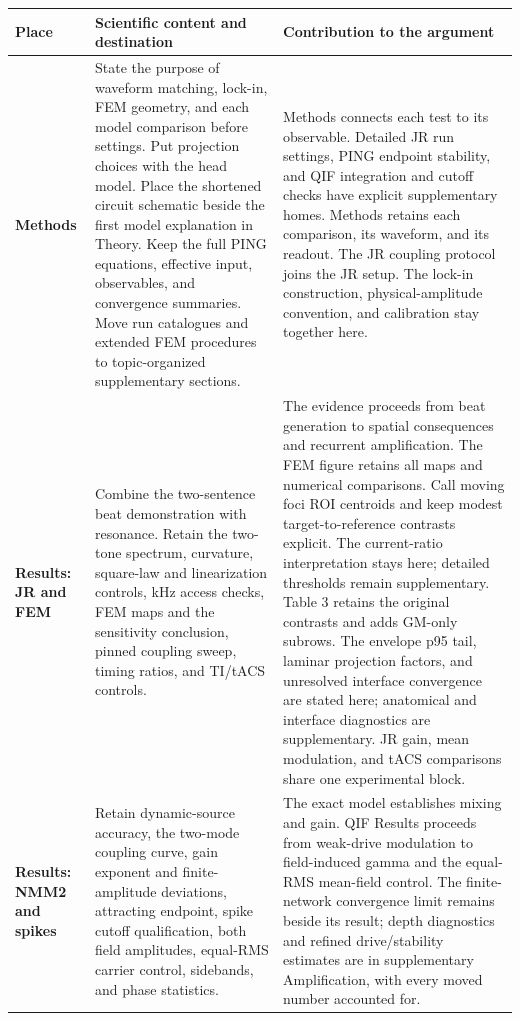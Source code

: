 \documentclass[11pt,a4paper,landscape]{article}
\begin{document}
\begin{tabularx}{\textwidth}{@{}L{43mm}YY@{}}
\toprule
\textbf{Place} & \textbf{Scientific content and destination} & \textbf{Contribution to the argument}\\
\midrule
\textbf{Methods} & State the purpose of waveform matching, lock-in, FEM geometry, and each model comparison before settings. Put projection choices with the head model. Place the shortened circuit schematic beside the first model explanation in Theory. Keep the full PING equations, effective input, observables, and convergence summaries. Move run catalogues and extended FEM procedures to topic-organized supplementary sections. & Methods connects each test to its observable. Detailed JR run settings, PING endpoint stability, and QIF integration and cutoff checks have explicit supplementary homes. Methods retains each comparison, its waveform, and its readout. The JR coupling protocol joins the JR setup. The lock-in construction, physical-amplitude convention, and calibration stay together here.\\[8pt]
\textbf{Results: JR and FEM} & Combine the two-sentence beat demonstration with resonance. Retain the two-tone spectrum, curvature, square-law and linearization controls, kHz access checks, FEM maps and the sensitivity conclusion, pinned coupling sweep, timing ratios, and TI/tACS controls. & The evidence proceeds from beat generation to spatial consequences and recurrent amplification. The FEM figure retains all maps and numerical comparisons. Call moving foci ROI centroids and keep modest target-to-reference contrasts explicit. The current-ratio interpretation stays here; detailed thresholds remain supplementary. Table 3 retains the original contrasts and adds GM-only subrows. The envelope p95 tail, laminar projection factors, and unresolved interface convergence are stated here; anatomical and interface diagnostics are supplementary. JR gain, mean modulation, and tACS comparisons share one experimental block.\\[8pt]
\textbf{Results: NMM2 and spikes} & Retain dynamic-source accuracy, the two-mode coupling curve, gain exponent and finite-amplitude deviations, attracting endpoint, spike cutoff qualification, both field amplitudes, equal-RMS carrier control, sidebands, and phase statistics. & The exact model establishes mixing and gain. QIF Results proceeds from weak-drive modulation to field-induced gamma and the equal-RMS mean-field control. The finite-network convergence limit remains beside its result; depth diagnostics and refined drive/stability estimates are in supplementary Amplification, with every moved number accounted for.\\[8pt]
\bottomrule\end{tabularx}
\end{document}
